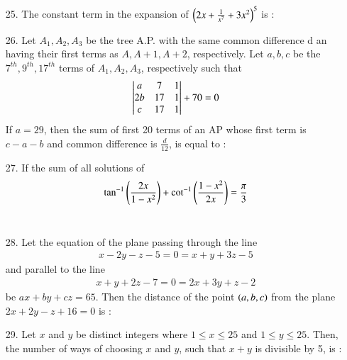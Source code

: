 \documentclass[journal,12pt,onecolumn]{IEEEtran}
\theoremstyle{remark}
\begin{document}
\begin{enumerate}
    \item[25.] The constant term in the expansion of $\left(2x + \frac{1}{x^7} + 3x^2\right)^5$ is : 
        \hfill{}\\


    \item[26.] Let $A_1, A_2, A_3$ be the tree A.P. with the same common difference d an having their 
        first terms as $A, A + 1, A + 2$, respectively. Let $a, b, c$ be the $7^{th}, 9^{th}, 17^{th}$
        terms of $A_1, A_2, A_3$, respectively such that 
        \begin{align}
            \begin{vmatrix}
                a & 7 & 1 \\
                2b & 17 & 1 \\
                c & 17 & 1
            \end{vmatrix} + 70 = 0
        \end{align} If $a = 29$, then the sum of first 20 terms of an AP whose first term is 
        $c - a - b$ and common difference is $\frac{d}{12}$, is equal to :
        \hfill{}\\


    \item[27.] If the sum of all solutions of 
        \begin{align}
            \tan ^{-1} \left(\frac{2x}{1 - x^2}\right) + \cot ^ {-1} \left(\frac{1 - x^2}{2x}\right) = \frac{\pi}{3}
        \end{align}
        \hfill{}\\

    \item[28.] Let the equation of the plane passing through the line 
        \begin{align}
            x - 2y - z - 5 = 0 = x + y + 3z - 5
        \end{align} and parallel to the line
        \begin{align}
            x + y + 2z - 7 = 0 = 2x + 3y + z - 2
        \end{align} be $ax + by + cz = 65$. Then the distance of the point $\left(a, b, c\right)$
        from the plane $2x + 2y - z + 16 = 0$ is :
        \hfill{}\\



    \item[29.] Let $x$ and $y$ be distinct integers where $1 \le x \le 25$ and $1 \le y \le 25$. Then, the
        number of ways of choosing $x$ and $y$, such that $x + y$ is divisible by 5, is :
        \hfill{}\\



\end{enumerate}
\end{document}
